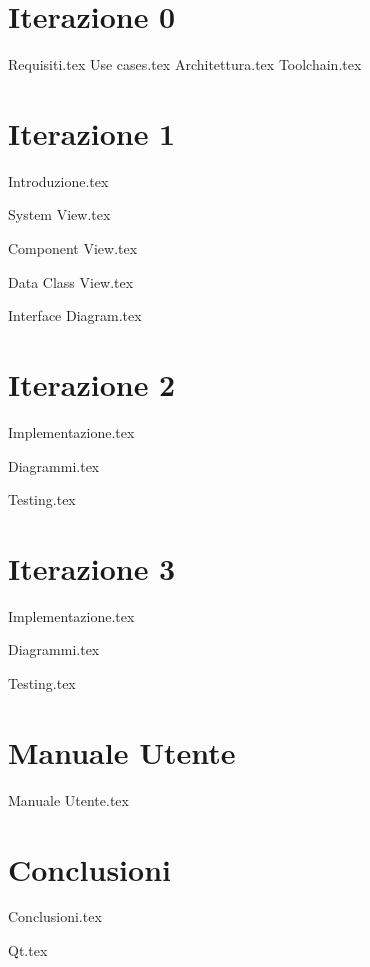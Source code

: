 \documentclass{report}
\begin{document}
	\tableofcontents
	
	\chapter{Iterazione 0}

	{Requisiti.tex}
	{Use cases.tex}
	{Architettura.tex}
	\clearpage
	{Toolchain.tex}
	
	\chapter{Iterazione 1}
	
	{Introduzione.tex}
	
	{System View.tex}
	
	\clearpage
	
	{Component View.tex}
	
	\clearpage
	
	{Data Class View.tex}	
	
	\clearpage
	
	{Interface Diagram.tex}
	
	\clearpage
	
	
	
	\chapter{Iterazione 2}
	{Implementazione.tex}
	
	\clearpage
	
	{Diagrammi.tex}
	
	\clearpage
	
	{Testing.tex}
	
	\clearpage
	
	\chapter{Iterazione 3}
	{Implementazione.tex}
	
	\clearpage
	
	{Diagrammi.tex}
	
	\clearpage
	
	{Testing.tex}
		
	\clearpage
	\chapter{Manuale Utente}
	{Manuale Utente.tex}
	
	\clearpage
	
	\chapter{Conclusioni}
	{Conclusioni.tex}
	
	{Qt.tex}
		
	
\end{document}
